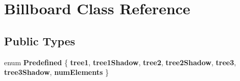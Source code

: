 \hypertarget{classBillboard}{\section{\-Billboard \-Class \-Reference}
\label{classBillboard}
}
\subsection*{\-Public \-Types}
\begin{DoxyCompactItemize}
\item 
enum {\bfseries \-Predefined} \{ \*
{\bfseries tree1}, 
{\bfseries tree1\-Shadow}, 
{\bfseries tree2}, 
{\bfseries tree2\-Shadow}, 
\*
{\bfseries tree3}, 
{\bfseries tree3\-Shadow}, 
{\bfseries num\-Elements}
 \}
\end{DoxyCompactItemize}
